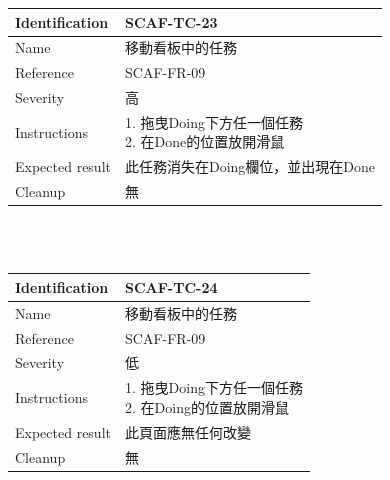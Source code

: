 \documentclass{report}
\begin{document}
\begin{tabularx}{\textwidth}{
  |p{}%
  |p{}|%
  }
  \hline
  \centering Identification &  SCAF-TC-23 \\
  \hline
  \centering Name & 移動看板中的任務 \\
  \hline
  \centering Reference & SCAF-FR-09 \\
  \hline
  \centering Severity & 高 \\
  \hline
  \centering Instructions & 
  \makecell[l]{
    1. 拖曳Doing下方任一個任務  \\
    2. 在Done的位置放開滑鼠 
  }\\
  \hline
  \centering Expected result & 此任務消失在Doing欄位，並出現在Done \\
  \hline
  \centering Cleanup & 無 \\
  \hline
\end{tabularx}
\\
\newline
\\
\begin{tabularx}{\textwidth}{
  |p{}%
  |p{}|%
  }
  \hline
  \centering Identification &  SCAF-TC-24 \\
  \hline
  \centering Name & 移動看板中的任務 \\
  \hline
  \centering Reference & SCAF-FR-09 \\
  \hline
  \centering Severity & 低 \\
  \hline
  \centering Instructions & 
  \makecell[l]{
    1. 拖曳Doing下方任一個任務  \\
    2. 在Doing的位置放開滑鼠  \\
  }\\
  \hline
  \centering Expected result & 此頁面應無任何改變 \\
  \hline
  \centering Cleanup & 無 \\
  \hline
\end{tabularx}
\\
\newline
\\
\end{document}
